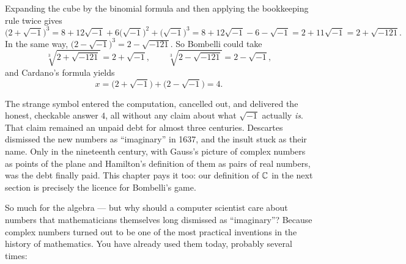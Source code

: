 \begin{example}
Expanding the cube by the binomial formula and then applying the bookkeeping rule twice gives
\[
\big(2+\sqrt{-1}\big)^3 = 8 + 12\sqrt{-1} + 6\big(\sqrt{-1}\big)^2 + \big(\sqrt{-1}\big)^3
= 8 + 12\sqrt{-1} - 6 - \sqrt{-1} = 2 + 11\sqrt{-1} = 2+\sqrt{-121}.
\]
In the same way, $\big(2-\sqrt{-1}\big)^3 = 2-\sqrt{-121}$. So Bombelli could take
\[
\sqrt[3]{2+\sqrt{-121}} = 2+\sqrt{-1}, \qquad \sqrt[3]{2-\sqrt{-121}} = 2-\sqrt{-1},
\]
and Cardano's formula yields
\[
x = \big(2+\sqrt{-1}\big) + \big(2-\sqrt{-1}\big) = 4.
\]
\end{example}

\noindent The strange symbol entered the computation, cancelled out, and delivered the honest, checkable
answer $4$, all without any claim about what $\sqrt{-1}$ actually \emph{is}. That claim remained an unpaid
debt for almost three centuries. Descartes dismissed the new numbers as ``imaginary'' in 1637, and the
insult stuck as their name. Only in the nineteenth century, with Gauss's picture of complex numbers as
points of the plane and Hamilton's definition of them as pairs of real numbers, was the debt finally paid.
This chapter pays it too: our definition of $\mathbb{C}$ in the next section is precisely the licence for
Bombelli's game.

So much for the algebra — but why should a computer scientist care about numbers that mathematicians
themselves long dismissed as ``imaginary''? Because complex numbers turned out to be one of the most
practical inventions in the history of mathematics. You have already used them today, probably several
times:

